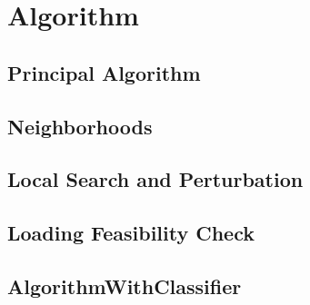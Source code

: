 \chapter{Algorithm}
\label{chap:algorithm}

\section{Principal Algorithm}
\label{sec:algorithm}



\section{Neighborhoods}
\label{sec:neighborhoods}

\section{Local Search and Perturbation}
\label{sec:LSandPerturbation}

\section{Loading Feasibility Check}
\label{sec:FeasibilityCheck}



\section{AlgorithmWithClassifier}
\label{sec:AlgorithmWithClassifier}
